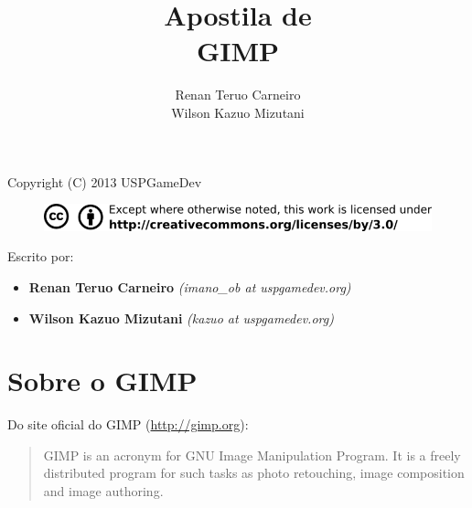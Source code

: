 \documentclass[12pt,onecolumn]{article}
\begin{document}
\begin{titlepage}

    \title{
        \bf
        \LARGE Apostila de \\
        \Huge  GIMP
    }
    
    \author{Renan Teruo Carneiro \\ Wilson Kazuo Mizutani}
    
    \maketitle
    
    \thispagestyle{empty}
    
\end{titlepage}

\begin{center}
  Copyright (C) 2013 USPGameDev
\end{center}
\begin{figure}[ht]
  \centering
  \includegraphics[width=\textwidth]{CC-BY.png}
\end{figure}

\vspace{300pt}

Escrito por:
\begin{itemize}
  \item \textbf{Renan Teruo Carneiro} \textit{(imano\_ob at uspgamedev.org)}
  \item \textbf{Wilson Kazuo Mizutani} \textit{(kazuo at uspgamedev.org)}
\end{itemize}

\clearpage

\tableofcontents

\clearpage

\section{Sobre o GIMP}
  Do site oficial do GIMP (\url{http://gimp.org}):
  
  \begin{quotation}
    GIMP is an acronym for GNU Image Manipulation Program. It is a freely
    distributed program for such tasks as photo retouching, image composition
    and image authoring.
  \end{quotation}
  
\end{document}
